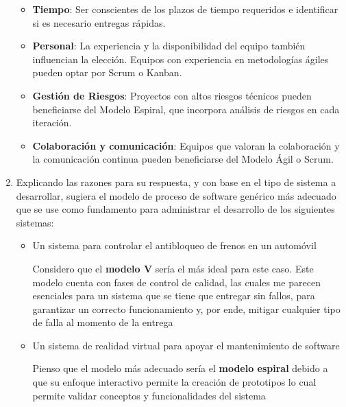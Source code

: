 \begin{enumerate}
\begin{itemize}
                \item \textbf{Tiempo}: Ser conscientes de los plazos de tiempo requeridos e
                    identificar si es necesario entregas rápidas.

                \item \textbf{Personal}: La experiencia y la disponibilidad del equipo también
                    influencian la elección. Equipos con experiencia en metodologías
                    ágiles pueden optar por Scrum o Kanban.

                \item \textbf{Gestión de Riesgos}: Proyectos con altos riesgos técnicos pueden
                    beneficiarse del Modelo Espiral, que incorpora análisis de riesgos en
                    cada iteración.

                \item \textbf{Colaboración y comunicación}: Equipos que valoran la colaboración
                    y la comunicación continua pueden beneficiarse del Modelo Ágil o Scrum.
            \end{itemize}

        \item Explicando las razones para su respuesta, y con base en el tipo de sistema a
            desarrollar, sugiera el modelo de proceso de software genérico más adecuado que
            se use como fundamento para administrar el desarrollo de los siguientes sistemas:

            \begin{itemize}
                \item Un sistema para controlar el antibloqueo de frenos en un automóvil

                    Considero que el \textbf{modelo V} sería el más ideal para este caso.
                    Este modelo cuenta con fases de control de calidad, las cuales me parecen
                    esenciales para un sistema que se tiene que entregar sin fallos, para
                    garantizar un correcto funcionamiento y, por ende, mitigar cualquier
                    tipo de falla al momento de la entrega

                \item Un sistema de realidad virtual para apoyar el mantenimiento de software

                    Pienso que el modelo más adecuado sería el \textbf{modelo espiral} debido
                    a que su enfoque interactivo permite la creación de prototipos lo cual
                    permite validar conceptos y funcionalidades del sistema


\end{itemize}
\end{enumerate}
